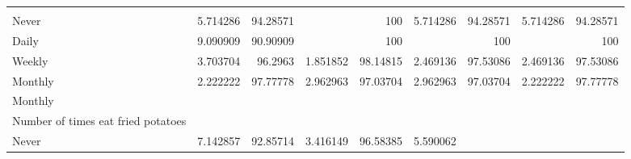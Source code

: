 \documentclass{article}
\begin{document}
\begin{tabular}{lllllllll}
  \multicolumn{1}{r}{} &
  \multicolumn{1}{r}{} &
  \multicolumn{1}{r}{} &
  \multicolumn{1}{r}{} &
  \multicolumn{1}{r}{} &
  \multicolumn{1}{r}{} &
  \multicolumn{1}{r}{} \\
\multicolumn{1}{l}{\hspace{5em}Never} &
  \multicolumn{1}{|r}{5.714286} &
  \multicolumn{1}{r}{94.28571} &
  \multicolumn{1}{r}{} &
  \multicolumn{1}{r}{100} &
  \multicolumn{1}{r}{5.714286} &
  \multicolumn{1}{r}{94.28571} &
  \multicolumn{1}{r}{5.714286} &
  \multicolumn{1}{r}{94.28571} \\
\multicolumn{1}{l}{\hspace{5em}Daily} &
  \multicolumn{1}{|r}{9.090909} &
  \multicolumn{1}{r}{90.90909} &
  \multicolumn{1}{r}{} &
  \multicolumn{1}{r}{100} &
  \multicolumn{1}{r}{} &
  \multicolumn{1}{r}{100} &
  \multicolumn{1}{r}{} &
  \multicolumn{1}{r}{100} \\
\multicolumn{1}{l}{\hspace{5em}Weekly} &
  \multicolumn{1}{|r}{3.703704} &
  \multicolumn{1}{r}{96.2963} &
  \multicolumn{1}{r}{1.851852} &
  \multicolumn{1}{r}{98.14815} &
  \multicolumn{1}{r}{2.469136} &
  \multicolumn{1}{r}{97.53086} &
  \multicolumn{1}{r}{2.469136} &
  \multicolumn{1}{r}{97.53086} \\
\multicolumn{1}{l}{\hspace{5em}Monthly} &
  \multicolumn{1}{|r}{2.222222} &
  \multicolumn{1}{r}{97.77778} &
  \multicolumn{1}{r}{2.962963} &
  \multicolumn{1}{r}{97.03704} &
  \multicolumn{1}{r}{2.962963} &
  \multicolumn{1}{r}{97.03704} &
  \multicolumn{1}{r}{2.222222} &
  \multicolumn{1}{r}{97.77778} \\
\multicolumn{1}{l}{\hspace{3em}Monthly} &
  \multicolumn{1}{|r}{} &
  \multicolumn{1}{r}{} &
  \multicolumn{1}{r}{} &
  \multicolumn{1}{r}{} &
  \multicolumn{1}{r}{} &
  \multicolumn{1}{r}{} &
  \multicolumn{1}{r}{} &
  \multicolumn{1}{r}{} \\
\multicolumn{1}{l}{\hspace{4em}Number of times eat fried potatoes} &
  \multicolumn{1}{|r}{} &
  \multicolumn{1}{r}{} &
  \multicolumn{1}{r}{} &
  \multicolumn{1}{r}{} &
  \multicolumn{1}{r}{} &
  \multicolumn{1}{r}{} &
  \multicolumn{1}{r}{} &
  \multicolumn{1}{r}{} \\
\multicolumn{1}{l}{\hspace{5em}Never} &
  \multicolumn{1}{|r}{7.142857} &
  \multicolumn{1}{r}{92.85714} &
  \multicolumn{1}{r}{3.416149} &
  \multicolumn{1}{r}{96.58385} &
  \multicolumn{1}{r}{5.590062} &

\end{tabular}
\end{document}

